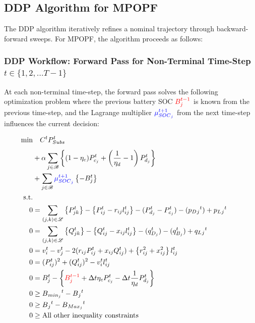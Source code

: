 \subsection{DDP Algorithm for MPOPF}

The DDP algorithm iteratively refines a nominal trajectory through backward-forward sweeps. For MPOPF, the algorithm proceeds as follows:

\subsubsection*{DDP Workflow: Forward Pass for Non-Terminal Time-Step $t \in \{1, 2, \ldots T-1\}$}

At each non-terminal time-step, the forward pass solves the following optimization problem where the previous battery SOC $\textcolor{red}{B_{j}^{t-1}}$ is known from the previous time-step, and the Lagrange multiplier $\textcolor{blue}{\mu_{SOC{_j}}^{t+1}}$ from the next time-step influences the current decision:

\begin{gather}
    \begin{align}
        \min_{} 
        \vspace{-15ex}
        & \quad
        C^t P_{Subs}^t \\
        &+ \alpha \sum_{j \in \mathcal{B}} \left\{ (1- \eta_c)P_{c_j}^t + \left(\frac{1}{\eta_d}-1\right) P_{d_j}^t \right\} \nonumber\\
        &+ \sum_{j \in \mathcal{B}} { \textcolor{blue}{ \mu_{SOC{_j}}^{t+1}} \left\{ - B_{j}^{t} \right\} } \nonumber\\
        \text{s.t.} & {}\nonumber\\
        {0} & = {\sum_{(j, k) \in \mathcal{L}} \left\{P_{jk}^t\right\} - \left\{P_{ij}^t - r_{ij}l_{ij}^t\right\} - (P_{d_j}^t - P_{c_j}^t)  - (p_D{_j}^t) + p_L{_j}^t} && \\
        {0} & = {\sum_{(j, k) \in \mathcal{L}} \left\{Q_{jk}^t\right\} - \left\{Q_{ij}^t - x_{ij}l_{ij}^t\right\} - (q_{D_j}^t) - (q_{B_j}^t) + q_L{_j}^t} && \\
        {0} & = {v_{i}^t - v_{j}^t - 2(r_{ij}P_{ij}^t + x_{ij}Q_{ij}^t) + \left\{r_{ij}^2 + x_{ij}^2\right\}l_{ij}^t}  && \\
        {0} & = {(P_{ij}^{t})^2 + (Q_{ij}^{t})^2 - v_{i}^t l_{ij}^t } \\
        {0} & = {B_{j}^{t} - \left\{ \textcolor{red}{ B_{j}^{t-1} } + \Delta t  \eta_c P_{c_j}^t - \Delta t\frac{1}{\eta_d} P_{d_j}^t \right\} } \\
        {0} & \geq {B{_{min_{j}}}^t - B{_j}^t} \\
        {0} & \geq {B{_j}^t - B{_{Max_{j}}}^t} \\
        {0} & \geq {\text{All other inequality constraints}}
    \end{align}
\end{gather}

